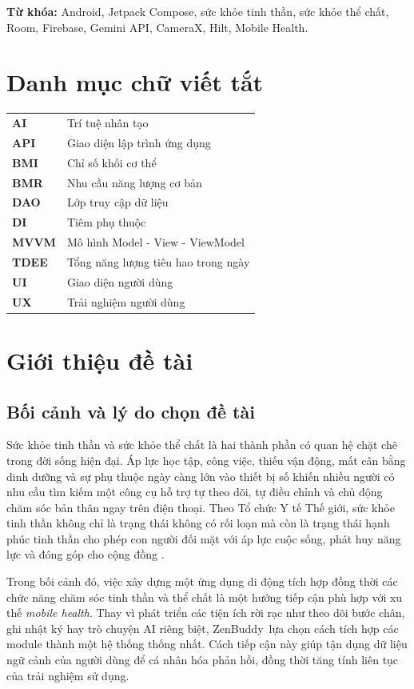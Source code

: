 \documentclass{zenbuddy-report}
\newcommand{\appname}{ZenBuddy}
\begin{document}
\noindent\textbf{Từ khóa:} Android, Jetpack Compose, sức khỏe tinh thần, sức khỏe thể chất, Room, Firebase, Gemini API, CameraX, Hilt, Mobile Health.

\chapter*{Danh mục chữ viết tắt}
\begin{tabularx}{\textwidth}{>{\bfseries}p{2.8cm}X}
AI & Trí tuệ nhân tạo \\
API & Giao diện lập trình ứng dụng \\
BMI & Chỉ số khối cơ thể \\
BMR & Nhu cầu năng lượng cơ bản \\
DAO & Lớp truy cập dữ liệu \\
DI & Tiêm phụ thuộc \\
MVVM & Mô hình Model - View - ViewModel \\
TDEE & Tổng năng lượng tiêu hao trong ngày \\
UI & Giao diện người dùng \\
UX & Trải nghiệm người dùng \\
\end{tabularx}

\tableofcontents
\listoffigures
\listoftables

\clearpage
{}

\chapter{Giới thiệu đề tài}

\section{Bối cảnh và lý do chọn đề tài}
Sức khỏe tinh thần và sức khỏe thể chất là hai thành phần có quan hệ chặt chẽ trong đời sống hiện đại. Áp lực học tập, công việc, thiếu vận động, mất cân bằng dinh dưỡng và sự phụ thuộc ngày càng lớn vào thiết bị số khiến nhiều người có nhu cầu tìm kiếm một công cụ hỗ trợ tự theo dõi, tự điều chỉnh và chủ động chăm sóc bản thân ngay trên điện thoại. Theo Tổ chức Y tế Thế giới, sức khỏe tinh thần không chỉ là trạng thái không có rối loạn mà còn là trạng thái hạnh phúc tinh thần cho phép con người đối mặt với áp lực cuộc sống, phát huy năng lực và đóng góp cho cộng đồng \cite{who-mental-health}.

Trong bối cảnh đó, việc xây dựng một ứng dụng di động tích hợp đồng thời các chức năng chăm sóc tinh thần và thể chất là một hướng tiếp cận phù hợp với xu thế \textit{mobile health}. Thay vì phát triển các tiện ích rời rạc như theo dõi bước chân, ghi nhật ký hay trò chuyện AI riêng biệt, \appname\ lựa chọn cách tích hợp các module thành một hệ thống thống nhất. Cách tiếp cận này giúp tận dụng dữ liệu ngữ cảnh của người dùng để cá nhân hóa phản hồi, đồng thời tăng tính liên tục của trải nghiệm sử dụng.
\end{document}
